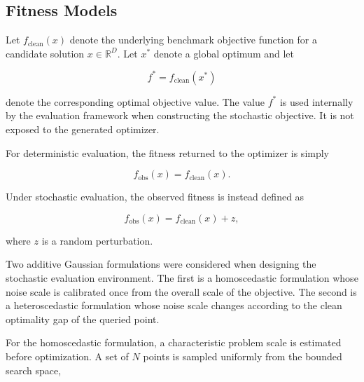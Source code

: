 \subsection{Fitness Models}
\label{subsec:deterministic_stochastic}

Let $f_{\mathrm{clean}}(x)$ denote the underlying benchmark objective function
for a candidate solution $x \in \mathbb{R}^{D}$. Let $x^*$ denote a global
optimum and let

\begin{equation}
f^* = f_{\mathrm{clean}}(x^*)
\label{eq:true_optimum}
\end{equation}

denote the corresponding optimal objective value. The value $f^*$ is used
internally by the evaluation framework when constructing the stochastic
objective. It is not exposed to the generated optimizer.

For deterministic evaluation, the fitness returned to the optimizer is simply

\begin{equation}
f_{\mathrm{obs}}(x) = f_{\mathrm{clean}}(x).
\label{eq:deterministic_objective}
\end{equation}

Under stochastic evaluation, the observed fitness is instead defined as

\begin{equation}
f_{\mathrm{obs}}(x) = f_{\mathrm{clean}}(x) + z,
\label{eq:stochastic_objective}
\end{equation}

where $z$ is a random perturbation.

Two additive Gaussian formulations were considered when designing the
stochastic evaluation environment. The first is a homoscedastic formulation
whose noise scale is calibrated once from the overall scale of the objective.
The second is a heteroscedastic formulation whose noise scale changes
according to the clean optimality gap of the queried point.



For the homoscedastic formulation, a characteristic problem scale is estimated
before optimization. A set of $N$ points is sampled uniformly from the bounded
search space,

